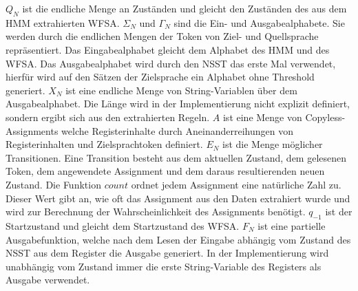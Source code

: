 \documentclass[conference]{IEEEtran}
\begin{document}
$Q_N$ ist die endliche Menge an Zuständen und gleicht den Zuständen des aus dem HMM extrahierten WFSA.
$\Sigma_N$ und $\Gamma_N$ sind die Ein- und Ausgabealphabete. 
Sie werden durch die endlichen Mengen der Token von Ziel- und Quellsprache repräsentiert. Das Eingabealphabet gleicht dem Alphabet des HMM und des WFSA. 
Das Ausgabealphabet wird durch den NSST das erste Mal verwendet, hierfür wird auf den Sätzen der Zielsprache ein Alphabet ohne Threshold generiert.
$X_N$ ist eine endliche Menge von String-Variablen über dem Ausgabealphabet.
Die Länge wird in der Implementierung nicht explizit definiert, sondern ergibt sich aus den extrahierten Regeln.
$A$ ist eine Menge von Copyless-Assignments welche Registerinhalte durch Aneinanderreihungen von Registerinhalten und Zielsprachtoken definiert.
$E_N$ ist die Menge möglicher Transitionen.
Eine Transition besteht aus dem aktuellen Zustand, dem gelesenen Token, dem angewendete Assignment und dem daraus resultierenden neuen Zustand.
Die Funktion $count$ ordnet jedem Assignment eine natürliche Zahl zu.
Dieser Wert gibt an, wie oft das Assignment aus den Daten extrahiert wurde und wird zur Berechnung der Wahrscheinlichkeit des Assignments benötigt.
$q_{-1}$ ist der Startzustand und gleicht dem Startzustand des WFSA.
$F_N$ ist eine partielle Ausgabefunktion, welche nach dem Lesen der Eingabe abhängig vom Zustand des NSST aus dem Register die Ausgabe generiert.
In der Implementierung wird unabhängig vom Zustand immer die erste String-Variable des Registers als Ausgabe verwendet.

\end{document}
